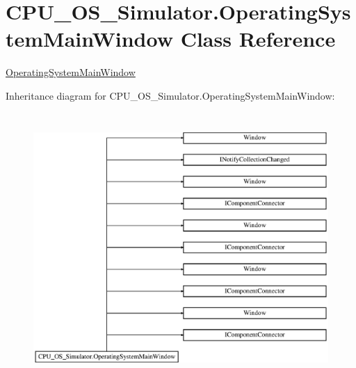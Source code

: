 \hypertarget{class_c_p_u___o_s___simulator_1_1_operating_system_main_window}{}\section{C\+P\+U\+\_\+\+O\+S\+\_\+\+Simulator.\+Operating\+System\+Main\+Window Class Reference}
\label{class_c_p_u___o_s___simulator_1_1_operating_system_main_window}


\hyperlink{class_c_p_u___o_s___simulator_1_1_operating_system_main_window}{Operating\+System\+Main\+Window}  


Inheritance diagram for C\+P\+U\+\_\+\+O\+S\+\_\+\+Simulator.\+Operating\+System\+Main\+Window\+:\begin{figure}[H]
\begin{center}
\leavevmode
\includegraphics[height=10.232557cm]{class_c_p_u___o_s___simulator_1_1_operating_system_main_window}
\end{center}
\end{figure}
